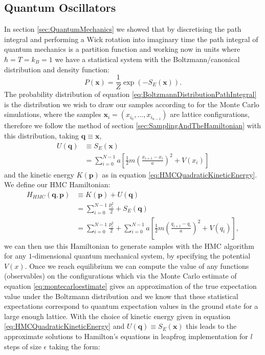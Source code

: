 \documentclass[12pt]{article}
\begin{document}
    \subsection{Quantum Oscillators}
    In section \ref{sec:QuantumMechanics} we showed that by discretising the path integral and performing a Wick rotation into imaginary time the path integral of quantum mechanics is a partition function and working now in units where $\hbar=T=k_B=1$ we have a statistical system with the Boltzmann/canonical distribution and density function:
    \begin{equation}
        \label{eq:BoltzmannDistributionPathIntegral}
        P\left(\bm{x}\right) = \frac{1}{Z}\exp{\left(-S_E\left(\bm{x}\right)\right)}.
    \end{equation}
    The probability distribution of equation \ref{eq:BoltzmannDistributionPathIntegral} is the distribution we wish to draw our samples according to for the Monte Carlo simulations, where the samples $\bm{x}_i=\left(x_{i_{0}},\dots,x_{i_{n-1}}\right)$ are lattice configurations, therefore we follow the method of section \ref{sec:SamplingAndTheHamiltonian} with this distribution, taking $\bm{q}\equiv\bm{x}$,
    \begin{align}
        \label{eq:QuantumHMCPotential}
        U\left(\bm{q}\right) & \equiv S_E\left(\bm{x}\right) \\
                             & = \sum_{i=0}^{N-1} a \left[\frac{1}{2}m\left(\frac{x_{i+1}-x_{i}}{a}\right)^2 + V(x_i)\right]
    \end{align} 
    and the kinetic energy $K\left(\bm{p}\right)$ as in equation \ref{eq:HMCQuadraticKineticEnergy}. We define our HMC Hamiltonian:
    \begin{align}
        \label{eq:HMCQuantumMechanicalHamiltonian1}
        H_{HMC}\left(\bm{q},\bm{p}\right) & \equiv K\left(\bm{p}\right) + U\left(\bm{q}\right)\\
        \label{eq:HMCQuantumMechanicalHamiltonian2} & = \sum_{i=0}^{N-1} \frac{p_i^2}{2} + S_E\left(\bm{q}\right) \\
        \label{eq:HMCQuantumMechanicalHamiltonian3}& = \sum_{i=0}^{N-1} \frac{p_i^2}{2} + \sum_{i=0}^{N-1} a \left[\frac{1}{2}m\left(\frac{q_{i+1}-q_{i}}{a}\right)^2 + V\left(q_i\right)\right],
    \end{align} 
    we can then use this Hamiltonian to generate samples with the HMC algorithm for any $1$-dimensional quantum mechanical system, by specifying the potential $V\left(x\right)$. Once we reach equilibrium we can compute the value of any functions (observables) on the configurations which via the Monte Carlo estimate of equation \ref{eq:montecarloestimate} gives an approximation of the true expectation value under the Boltzmann distribution and we know that these statistical expectations correspond to quantum expectation values in the ground state for a large enough lattice.  With the choice of kinetic energy given in equation \ref{eq:HMCQuadraticKineticEnergy} and $U\left(\bm{q}\right) \equiv S_E\left(\bm{x}\right)$ this leads to the approximate solutions to Hamilton's equations in leapfrog implementation for $l$ steps of size $\epsilon$ taking the form:
\end{document}
